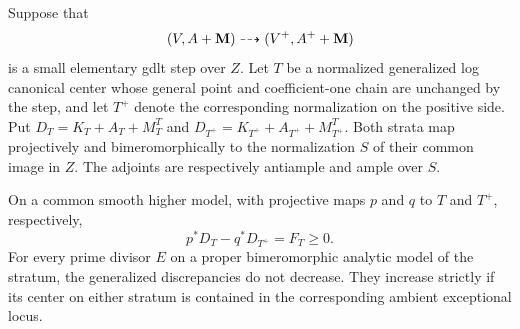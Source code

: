 \begin{lemma}
\label{lem:stratum-comparison}
Suppose that
\[
 (V,A+\mathbf M)\dashrightarrow (V^+,A^++\mathbf M)
\]
is a small elementary gdlt step over $Z$.  Let $T$ be a
normalized generalized log canonical center whose general
point and coefficient-one chain are unchanged by the step,
and let $T^+$ denote the corresponding normalization on the
positive side.  Put
$D_T=K_T+A_T+M_T^T$ and $D_{T^+}=K_{T^+}+A_{T^+}+M_{T^+}^T$.
Both strata map projectively and bimeromorphically to the
normalization $S$ of their common image in $Z$.  The adjoints
are respectively antiample and ample over $S$.

On a common smooth higher model, with projective maps $p$ and
$q$ to $T$ and $T^+$, respectively,
\begin{equation}\label{eq:restricted-positive-difference}
 p^*D_T-q^*D_{T^+}=F_T\geq0.
\end{equation}
For every prime divisor $E$ on a proper bimeromorphic analytic model
of the stratum, the generalized discrepancies do not decrease.
They increase strictly if its center on either stratum is
contained in the corresponding ambient exceptional locus.
\end{lemma}

